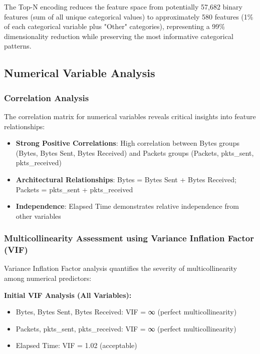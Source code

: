 \documentclass[12pt,a4paper]{article}
\begin{document}
The Top-N encoding reduces the feature space from potentially 57,682 binary features (sum of all unique categorical values) to approximately 580 features (1\% of each categorical variable plus "Other" categories), representing a 99\% dimensionality reduction while preserving the most informative categorical patterns.

\subsection{Numerical Variable Analysis}

\subsubsection{Correlation Analysis}

The correlation matrix for numerical variables reveals critical insights into feature relationships:

\begin{itemize}
    \item \textbf{Strong Positive Correlations}: High correlation between Bytes groups (Bytes, Bytes Sent, Bytes Received) and Packets groups (Packets, pkts\_sent, pkts\_received)
    \item \textbf{Architectural Relationships}: Bytes = Bytes Sent + Bytes Received; Packets = pkts\_sent + pkts\_received
    \item \textbf{Independence}: Elapsed Time demonstrates relative independence from other variables
\end{itemize}

\subsubsection{Multicollinearity Assessment using Variance Inflation Factor (VIF)}

Variance Inflation Factor analysis quantifies the severity of multicollinearity among numerical predictors:

\textbf{Initial VIF Analysis (All Variables):}
\begin{itemize}
    \item Bytes, Bytes Sent, Bytes Received: VIF = ∞ (perfect multicollinearity)
    \item Packets, pkts\_sent, pkts\_received: VIF = ∞ (perfect multicollinearity)
    \item Elapsed Time: VIF = 1.02 (acceptable)
\end{itemize}
\end{document}
